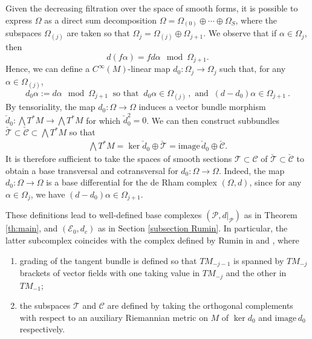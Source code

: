 \documentclass[10pt]{amsart}
\theoremstyle{remark}
\numberwithin{equation}{section}
\begin{document}
Given the decreasing filtration over the space of smooth forms, it is possible to express $\Omega$ as a direct sum decomposition $\Omega = \Omega_{(0)} \oplus \cdots \oplus \Omega_{S}$, where the subspaces $\Omega_{(j)}$ are taken so that $\Omega_j = \Omega_{(j)} \oplus \Omega_{j+1}$. We observe that if $\alpha \in \Omega_j$, then
$$d(f\alpha) = f d\alpha  \mod\Omega_{j+1}.$$
Hence, we can define a $C^\infty(M)$-linear map $d_0\colon\Omega_j\to\Omega_j$ such that, for any $\alpha \in\Omega_{(j)}$, 
$$d_0\alpha:=d\alpha\mod\Omega_{j+1}\ \text{ so that } \ d_0\alpha \in\Omega_{(j)}\,, \text{ and }\ (d-d_0) \alpha  \in \Omega_{j+1}\ .$$
By tensoriality, the map $d_0\colon\Omega\to\Omega$ induces a vector bundle morphism $\check{d}_0\colon\bigwedge T^*M\to\bigwedge T^*M$ for which $\check{d}_0^2=0$. We can then construct subbundles $\check{\mathcal{T}}\subset\check{\mathcal{C}}\subset\bigwedge T^*M$ so that
\begin{align*}
    \bigwedge T^*M=\ker\check{d}_0\oplus\check{\mathcal{T}}=\mathrm{image\,}\check{d}_0\oplus\check{\mathcal{C}}.
\end{align*}
It is therefore sufficient to take the spaces of smooth sections $\mathcal{T}\subset\mathcal{C}$ of $\check{\mathcal{T}}\subset\check{\mathcal{C}}$ to obtain a base transversal and cotransversal for $d_0\colon\Omega\to\Omega$. Indeed, the map $d_0\colon\Omega\to\Omega$ is a base differential for the de Rham complex $(\Omega,d)$, since for any $\alpha\in \Omega_j$, we have $(d-d_0)\alpha \in\Omega_{j+1}$. 

These definitions lead to well-defined base complexes $(\mathcal{P},d\vert_\mathcal{P})$ as in Theorem \ref{th:main}, and $(\mathcal{E}_0,d_c)$ as in Section \ref{subsection Rumin}. In particular, the latter subcomplex coincides with the complex defined by Rumin in \cite{Rumin3} and \cite{Rumin4}, where
\begin{enumerate}[$\bullet$]
\item grading of the tangent bundle is defined so that $TM_{-j-1}$ is spanned by $TM_{-j}$ brackets of vector fields with one taking value in $TM_{-j}$ and the other in $TM_{-1}$;
\item the subspaces $\mathcal{T}$ and $\mathcal{C}$ are defined by taking the orthogonal complements with respect to an auxiliary Riemannian metric on $M$ of $\ker d_0$ and $\mathrm{image\,}d_0$ respectively.
\end{enumerate}
\end{document}

